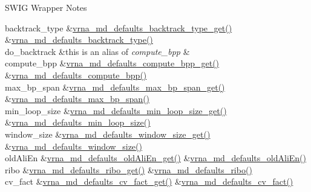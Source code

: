 \begin{DoxyRefDesc}{S\+W\+I\+G Wrapper Notes}
\begin{longtabu}
backtrack\+\_\+type  &\mbox{\hyperlink{group__model__details_ga1425b4ebd0e034dead66d79becd64143}{vrna\+\_\+md\+\_\+defaults\+\_\+backtrack\+\_\+type\+\_\+get()}}  &\mbox{\hyperlink{group__model__details_ga68305274de96b56b7799575e222560d8}{vrna\+\_\+md\+\_\+defaults\+\_\+backtrack\+\_\+type()}}   \\
do\+\_\+backtrack  &this is an alias of {\itshape compute\+\_\+bpp}  &\\
compute\+\_\+bpp  &\mbox{\hyperlink{group__model__details_gaa3a537e61fbe0518673bf9f73fd820f3}{vrna\+\_\+md\+\_\+defaults\+\_\+compute\+\_\+bpp\+\_\+get()}}  &\mbox{\hyperlink{group__model__details_gaf1b5db10f1f476767f9a95f8a78e3132}{vrna\+\_\+md\+\_\+defaults\+\_\+compute\+\_\+bpp()}}   \\
max\+\_\+bp\+\_\+span  &\mbox{\hyperlink{group__model__details_gaa60f989e062fecd4d4bac89c1883da85}{vrna\+\_\+md\+\_\+defaults\+\_\+max\+\_\+bp\+\_\+span\+\_\+get()}}  &\mbox{\hyperlink{group__model__details_ga4c4bc962f09b4480cb8499f1cf8ae4ec}{vrna\+\_\+md\+\_\+defaults\+\_\+max\+\_\+bp\+\_\+span()}}   \\
min\+\_\+loop\+\_\+size  &\mbox{\hyperlink{group__model__details_ga5cc691174a75c652807dc361b617632a}{vrna\+\_\+md\+\_\+defaults\+\_\+min\+\_\+loop\+\_\+size\+\_\+get()}}  &\mbox{\hyperlink{group__model__details_gac152f1e78c1058a10261022c8dfda0f7}{vrna\+\_\+md\+\_\+defaults\+\_\+min\+\_\+loop\+\_\+size()}}   \\
window\+\_\+size  &\mbox{\hyperlink{group__model__details_ga670146a9aa3ba77f4d422d60b7c30ac9}{vrna\+\_\+md\+\_\+defaults\+\_\+window\+\_\+size\+\_\+get()}}  &\mbox{\hyperlink{group__model__details_ga7b802ce0e8c3181bf5cb580de6d5b26a}{vrna\+\_\+md\+\_\+defaults\+\_\+window\+\_\+size()}}   \\
old\+Ali\+En  &\mbox{\hyperlink{group__model__details_ga2374492b5019df88022fe4c05f0f3630}{vrna\+\_\+md\+\_\+defaults\+\_\+old\+Ali\+En\+\_\+get()}}  &\mbox{\hyperlink{group__model__details_ga41521d5b9fb7e0f31e7ea73f5792afab}{vrna\+\_\+md\+\_\+defaults\+\_\+old\+Ali\+En()}}   \\
ribo  &\mbox{\hyperlink{group__model__details_ga169027f0c0561ea7d87b655e4b336bfc}{vrna\+\_\+md\+\_\+defaults\+\_\+ribo\+\_\+get()}}  &\mbox{\hyperlink{group__model__details_ga937c45e1d06fd6168730a9b08d130be3}{vrna\+\_\+md\+\_\+defaults\+\_\+ribo()}}   \\
cv\+\_\+fact  &\mbox{\hyperlink{group__model__details_gae59c68393807217b0a2497adb64d3ee3}{vrna\+\_\+md\+\_\+defaults\+\_\+cv\+\_\+fact\+\_\+get()}}  &\mbox{\hyperlink{group__model__details_gad3a3f40baafd91a6ce80a91a68e20053}{vrna\+\_\+md\+\_\+defaults\+\_\+cv\+\_\+fact()}}   \\

\end{longtabu}
\end{DoxyRefDesc}

